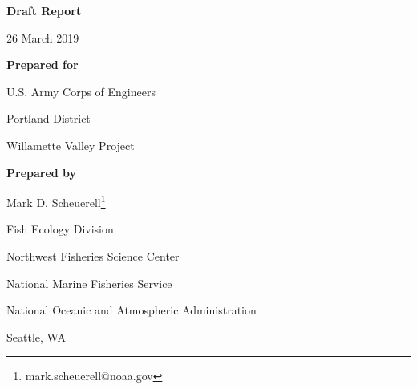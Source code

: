 \begin{center}

\textbf{Draft Report}

26 March 2019

\vspace{0.25in}

\textbf{Prepared for}

U.S. Army Corps of Engineers    

\setlength{\parskip}{0pt}

Portland District    

Willamette Valley Project    

\setlength{\parskip}{8pt}

\vspace{0.25in}

\textbf{Prepared by}

Mark D. Scheuerell\footnote{mark.scheuerell@noaa.gov}

\small

Fish Ecology Division

\setlength{\parskip}{0pt}

Northwest Fisheries Science Center

National Marine Fisheries Service

National Oceanic and Atmospheric Administration

Seattle, WA

\normalsize

\setlength{\parskip}{8pt}

\end{center}

\newpage

